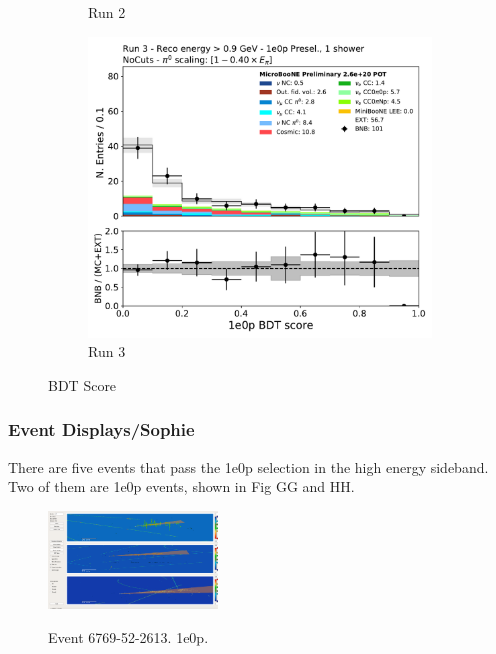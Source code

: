 \begin{figure}[H]
\begin{subfigure}{0.3\textwidth}
    \caption{Run 2}
    \end{subfigure}
    \begin{subfigure}{0.3\textwidth}
    \includegraphics[width=1.0\textwidth]{1e0p/High_E_Sideband/run3/bkg_score.pdf}
    \caption{Run 3}
    \end{subfigure}
    \caption{BDT Score} 
    \label{fig:low_0pbdt_sideband_plots}
\end{figure}
\subsubsection{Event Displays/Sophie}

There are five events that pass the 1e0p selection in the high energy sideband.  Two of them are 1e0p events, shown in Fig GG and HH.

\begin{figure}[H]
    \centering
    \includegraphics[width=0.4\textwidth]{1e0p/High_E_Sideband/evds/1e0p1_6769_52_2613.pdf}
    \caption{Event 6769-52-2613. 1e0p.}
    \caption{} 
    \label{fig:HE_1eNp_1}
\end{figure}

